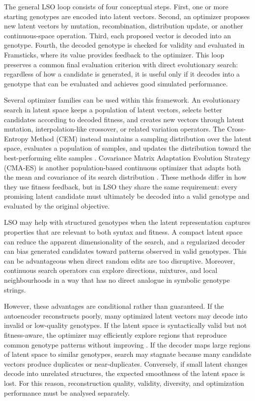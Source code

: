 The general LSO loop consists of four conceptual steps. First, one or more starting genotypes are encoded into latent vectors. Second, an optimizer proposes new latent vectors by mutation, recombination, distribution update, or another continuous-space operation. Third, each proposed vector is decoded into an \fone{} genotype. Fourth, the decoded genotype is checked for validity and evaluated in Framsticks, where its \vertpos{} value provides feedback to the optimizer. This loop preserves a common final evaluation criterion with direct evolutionary search: regardless of how a candidate is generated, it is useful only if it decodes into a genotype that can be evaluated and achieves good simulated performance.

Several optimizer families can be used within this framework. An evolutionary search in latent space keeps a population of latent vectors, selects better candidates according to decoded fitness, and creates new vectors through latent mutation, interpolation-like crossover, or related variation operators. The Cross-Entropy Method (CEM) instead maintains a sampling distribution over the latent space, evaluates a population of samples, and updates the distribution toward the best-performing elite samples \cite{Rubinstein1999}. Covariance Matrix Adaptation Evolution Strategy (CMA-ES) is another population-based continuous optimizer that adapts both the mean and covariance of its search distribution \cite{Hansen2016}. These methods differ in how they use fitness feedback, but in LSO they share the same requirement: every promising latent candidate must ultimately be decoded into a valid genotype and evaluated by the original objective.

LSO may help with structured genotypes when the latent representation captures properties that are relevant to both syntax and fitness. A compact latent space can reduce the apparent dimensionality of the search, and a regularized decoder can bias generated candidates toward patterns observed in valid genotypes. This can be advantageous when direct random edits are too disruptive. Moreover, continuous search operators can explore directions, mixtures, and local neighbourhoods in a way that has no direct analogue in symbolic genotype strings.

However, these advantages are conditional rather than guaranteed. If the autoencoder reconstructs poorly, many optimized latent vectors may decode into invalid or low-quality genotypes. If the latent space is syntactically valid but not fitness-aware, the optimizer may efficiently explore regions that reproduce common genotype patterns without improving \vertpos{}. If the decoder maps large regions of latent space to similar genotypes, search may stagnate because many candidate vectors produce duplicates or near-duplicates. Conversely, if small latent changes decode into unrelated structures, the expected smoothness of the latent space is lost. For this reason, reconstruction quality, validity, diversity, and optimization performance must be analysed separately.



